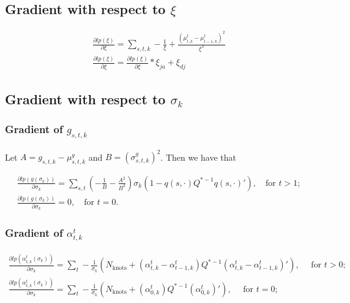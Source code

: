 \documentclass[12pt]{article}
\begin{document}
\subsection{Gradient with respect to $\xi$}

\begin{align*}
\frac{\partial lp (\xi)}{\partial \xi} = \sum_{s,t,k}  - \frac{1}{\xi} + \frac{(\mu_{t,k}^t - \mu_{t-1,k}^t)^2}{\xi^3} \\
\frac{\partial lp (\xi)}{\partial \xi} =\frac{\partial lp (\xi)}{\partial \xi} * \xi_{ja} + \xi_{dj}
\end{align*}

\subsection{Gradient with respect to $\sigma_k$}

\subsubsection{Gradient of $g_{s,t,k}$}

Let $A = g_{s,t,k} - \mu_{s,t,k}^g$ and $B=(\sigma_{s,t,k}^g)^2$. Then we have that

\begin{align*}
\frac{\partial lp (g (\sigma_k))}{\partial \sigma_k} = \sum_{s,t} \left( - \frac{1}{B} - \frac{A^2}{B^2} \right) \sigma_k \left( 1 - q(s, \cdot) Q^{*-1} q(s, \cdot)' \right), \quad \text{for } t>1; \\
\frac{\partial lp (g (\sigma_k))}{\partial \sigma_k} = 0, \quad \text{for } t=0.
\end{align*}

\subsubsection{Gradient of $\alpha_{t,k}^t$}

\begin{align*}
\frac{\partial lp (\alpha_{t,k}^t (\sigma_k))}{\partial \sigma_k} = \sum_{t} - \frac{1}{\sigma_k} \left( N_{\text{knots}} + (\alpha_{t,k}^t - \alpha_{t-1,k}^t) Q^{*-1} (\alpha_{t,k}^t - \alpha_{t-1,k}^t)' \right), \quad \text{ for  } t>0; \\ 
\frac{\partial lp (\alpha_{t,k}^t (\sigma_k))}{\partial \sigma_k} = \sum_{t} - \frac{1}{\sigma_k} \left( N_{\text{knots}} + (\alpha_{0,k}^t) Q^{*-1} (\alpha_{0,k}^t)' \right), \quad \text{ for  } t=0;
\end{align*}
\end{document}
